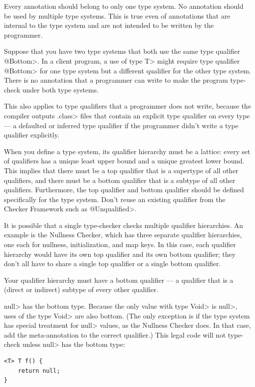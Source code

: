 Every annotation should belong to only one type system.  No annotation
should be used by multiple type systems.  This is true even of annotations
that are internal to the type system and are not intended to be written by
the programmer.

Suppose that you have two type systems that both use the same type
qualifier \<@Bottom>.  In a client program, a use of type \<T> might require type
qualifier \<@Bottom> for one type system but a different qualifier for the other
type system.  There is no annotation that a programmer can write to make
the program type-check under both type systems.

This also applies to type qualifiers that a programmer does not write,
because the compiler outputs \<.class> files that contain an explicit type
qualifier on every type --- a defaulted or inferred type qualifier if the
programmer didn't write a type qualifier explicitly.



When you define a type system, its qualifier hierarchy must be a
lattice:  every set of qualifiers has a unique least upper bound and a unique
greatest lower bound.  This implies that there must be a top qualifier that is a
supertype of all other qualifiers, and there must be a bottom qualifier that is a
subtype of all other qualifiers.
Furthermore, the top qualifier and bottom qualifier should be defined
specifically for the type system.  Don't reuse an existing qualifier from the
Checker Framework such as \<@Unqualified>.

It is possible that a single type-checker checks multiple qualifier hierarchies.
An example is the Nullness Checker, which has three separate qualifier
hierarchies, one each for
nullness, initialization, and map keys.  In this case, each qualifier hierarchy
would have its own top qualifier and its own bottom qualifier; they don't
all have to share a single top qualifier or a single bottom qualifier.


Your qualifier hierarchy must have a bottom qualifier
--- a qualifier that is a (direct or indirect) subtype of every other
qualifier.

\<null> has the bottom type. Because the only value with type \<Void> is
\<null>, uses of the type \<Void> are also bottom.
(The only exception
is if the type system has special treatment for \<null> values, as the
Nullness Checker does. In that case, add the meta-annotation
to the correct qualifier.)
This legal code
will not type-check unless \<null> has the bottom type:
\begin{Verbatim}
<T> T f() {
    return null;
}
\end{Verbatim}

